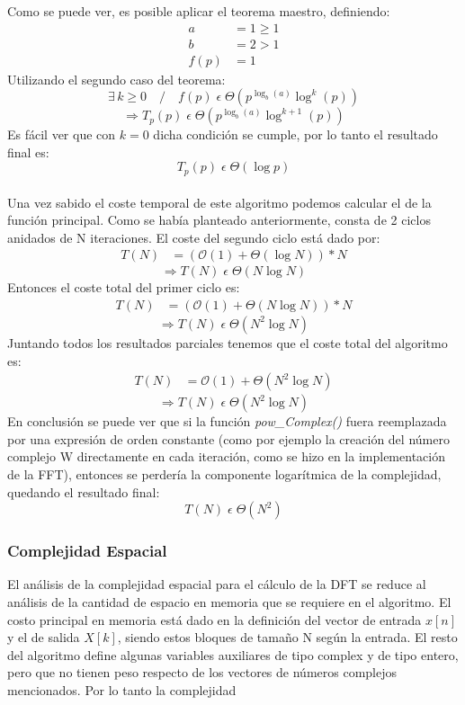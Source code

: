 \documentclass{article}
\begin{document}
    Como se puede ver, es posible aplicar el teorema maestro, definiendo:
    \begin{align*}
      a &= 1 \geq 1 \\
      b &= 2 > 1\\
   f(p) &= 1 
    \end{align*}
      Utilizando el segundo caso del teorema:
    $$ \exists\,k \geq 0 \quad / \quad f(p) \;\epsilon\; \Theta (p^{\log_b (a)} \log^k (p)) $$
    $$ \Rightarrow T_p(p)\;\epsilon\;\Theta (p^{\log_b (a)} \log^{k+1} (p)) $$
      Es fácil ver que con $k=0$ dicha condición se cumple, por lo tanto
    el resultado final es:
    $$ T_p(p)\;\epsilon\;\Theta (\log p) $$\\
  Una vez sabido el coste temporal de este algoritmo podemos calcular el de la función
  principal. Como se había planteado anteriormente, consta de 2 ciclos anidados de N iteraciones.
  El coste del segundo ciclo está dado por:
  \begin{align*}
      T(N) &= (\mathcal{O}(1) + {\Theta}(\log N)) * N
  \end{align*}
    $$ \Rightarrow T(N)\;\epsilon\;\Theta (N\log N) $$
  Entonces el coste total del primer ciclo es:
  \begin{align*}
      T(N) &= (\mathcal{O}(1) + {\Theta}(N\log N)) * N
  \end{align*}
  $$ \Rightarrow T(N)\;\epsilon\;\Theta (N^2\log N) $$
  Juntando todos los resultados parciales tenemos que el coste total del algoritmo es:
  \begin{align*}
      T(N) &= \mathcal{O}(1) + {\Theta}(N^2\log N)
  \end{align*}
  $$ \Rightarrow \boxed{ T(N)\;\epsilon\;\Theta (N^2\log N) } $$
    En conclusión se puede ver que si la función \textit{pow\_Complex()} fuera reemplazada por
  una expresión de orden constante (como por ejemplo la creación del número complejo W
  directamente en cada iteración, como se hizo en la implementación de la FFT), entonces se 
  perdería la componente logarítmica de la complejidad, quedando el resultado final:
  $$ \boxed{ T(N)\;\epsilon\;\Theta (N^2) } $$

\subsubsection{Complejidad Espacial}
El análisis de la complejidad espacial para el cálculo de la DFT se reduce al análisis de la cantidad de espacio en memoria que se requiere en el algoritmo. El costo principal en memoria está dado en la definición del vector de entrada $x[n]$ y el de salida $X[k]$, siendo estos bloques de tamaño N según la entrada. El resto del algoritmo define algunas variables auxiliares de tipo complex y de tipo entero, pero que no tienen peso respecto de los vectores de números complejos mencionados. Por lo tanto la complejidad 
\end{document}
